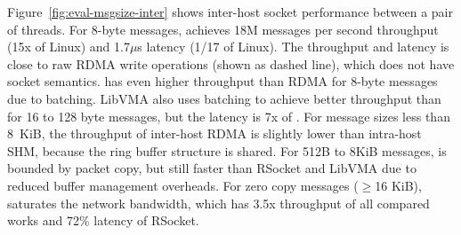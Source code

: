 Figure~\ref{fig:eval-msgsize-inter} shows inter-host socket performance between a pair of threads.
For 8-byte messages, \sys achieves 18M messages per second throughput (15x of Linux) and 1.7$\mu$s latency (1/17 of Linux).
The throughput and latency is close to raw RDMA write operations (shown as dashed line), which does not have socket semantics.
\sys{} has even higher throughput than RDMA for 8-byte messages due to batching.
LibVMA also uses batching to achieve better throughput than \sys{} for 16 to 128 byte messages, but the latency is 7x of \sys{}.
For message sizes less than 8~KiB, the throughput of inter-host RDMA is  slightly lower than intra-host SHM, because the ring buffer structure is shared.
For 512B to 8KiB messages, \sys{} is bounded by packet copy, but still faster than RSocket and LibVMA due to reduced buffer management overheads.
For zero copy messages ($\ge$16 KiB), \sys{} saturates the network bandwidth, which has 3.5x throughput of all compared works and 72\% latency of RSocket.



